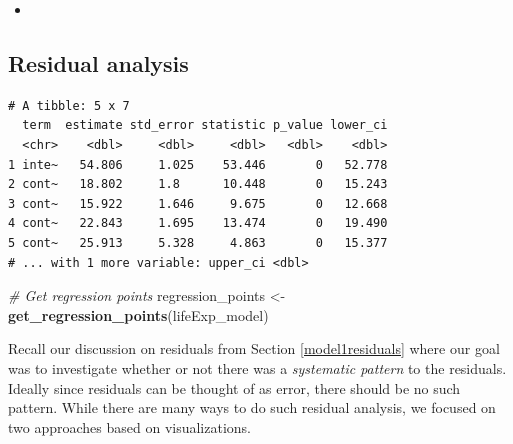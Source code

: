 \documentclass[12pt, krantz2,]{krantz}
\makeatletter
\newenvironment{Shaded}{\begin{snugshade}}{\end{snugshade}}
\newcommand{\CommentTok}[1]{\textcolor[rgb]{0.37,0.37,0.37}{\textit{#1}}}
\newcommand{\DataTypeTok}[1]{\textcolor[rgb]{0.27,0.27,0.27}{#1}}
\newcommand{\DecValTok}[1]{\textcolor[rgb]{0.06,0.06,0.06}{#1}}
\newcommand{\KeywordTok}[1]{\textcolor[rgb]{0.27,0.27,0.27}{\textbf{#1}}}
\newcommand{\NormalTok}[1]{#1}
\newcommand{\OperatorTok}[1]{\textcolor[rgb]{0.43,0.43,0.43}{\textbf{#1}}}
\newcommand{\StringTok}[1]{\textcolor[rgb]{0.5,0.5,0.5}{#1}}
\newenvironment{kframe}{%
\medskip{}
\setlength{\fboxsep}{.8em}
 \def\at@end@of@kframe{}%
 \ifinner\ifhmode%
  \def\at@end@of@kframe{\end{minipage}}%
  \begin{minipage}{\columnwidth}%
 \fi\fi%
 \def\FrameCommand##1{\hskip\@totalleftmargin \hskip-\fboxsep
 \colorbox{shadecolor}{##1}\hskip-\fboxsep
     \hskip-\linewidth \hskip-\@totalleftmargin \hskip\columnwidth}%
 \MakeFramed {\advance\hsize-\width
   \@totalleftmargin\z@ \linewidth\hsize
   \@setminipage}}%
 {\par\unskip\endMakeFramed%
 \at@end@of@kframe}
\renewenvironment{Shaded}{\begin{kframe}}{\end{kframe}}
\newenvironment{rmdblock}[1]
  {\begin{shaded*}
  \begin{itemize}
  \renewcommand{\labelitemi}{
    \raisebox{-.7\height}[0pt][0pt]{
    }
  }
  \item
  }
  {
  \end{itemize}
  \end{shaded*}
  }
\newenvironment{learncheck}
  {\begin{rmdblock}{warning}}
  {\end{rmdblock}}
\makeatother
\begin{document}
\begin{learncheck}

\end{learncheck}

\hypertarget{model2residuals}{%
\subsection{Residual analysis}\label{model2residuals}}

\begin{Shaded}
\end{Shaded}

\begin{verbatim}
# A tibble: 5 x 7
  term  estimate std_error statistic p_value lower_ci
  <chr>    <dbl>     <dbl>     <dbl>   <dbl>    <dbl>
1 inte~   54.806     1.025    53.446       0   52.778
2 cont~   18.802     1.8      10.448       0   15.243
3 cont~   15.922     1.646     9.675       0   12.668
4 cont~   22.843     1.695    13.474       0   19.490
5 cont~   25.913     5.328     4.863       0   15.377
# ... with 1 more variable: upper_ci <dbl>
\end{verbatim}

\begin{Shaded}
\begin{Highlighting}[]
\CommentTok{# Get regression points}
\NormalTok{regression_points <-}\StringTok{ }\KeywordTok{get_regression_points}\NormalTok{(lifeExp_model)}
\end{Highlighting}
\end{Shaded}

Recall our discussion on residuals from Section \ref{model1residuals} where our goal was to investigate whether or not there was a \emph{systematic pattern} to the residuals. Ideally since residuals can be thought of as error, there should be no such pattern. While there are many ways to do such residual analysis, we focused on two approaches based on visualizations.
\end{document}
